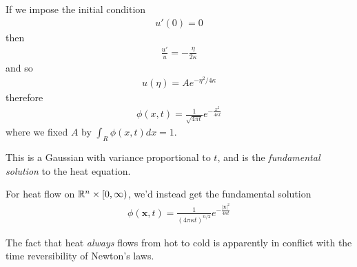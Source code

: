 \documentclass[a4paper]{article}
\begin{document}
If we impose the initial condition
\begin{equation*}
\begin{aligned}
u'\left(0\right) = 0
\end{aligned}
\end{equation*}
then
\begin{equation*}
\begin{aligned}
\frac{u'}{u} = -\frac{\eta}{2\kappa}
\end{aligned}
\end{equation*}
and so
\begin{equation*}
\begin{aligned}
u\left(\eta\right) = A e^{-\eta^2/4\kappa}
\end{aligned}
\end{equation*}
therefore
\begin{equation*}
\begin{aligned}
\phi\left(x,t\right) = \frac{1}{\sqrt{4\pi t}} e^{-\frac{x^2}{4\kappa t}}
\end{aligned}
\end{equation*}
where we fixed $A$ by $\int_R \phi\left(x,t\right) dx = 1$.

This is a Gaussian with variance proportional to $t$, and is the \emph{fundamental solution} to the heat equation.

For heat flow on $\mathbb{R}^n \times \left[0,\infty\right)$, we'd instead get the fundamental solution
\begin{equation*}
\begin{aligned}
\phi\left(\mathbf{x},t\right) = \frac{1}{\left(4\pi \kappa t\right)^{n/2}} e^{-\frac{|\mathbf{x}|^2}{4\kappa t}}
\end{aligned}
\end{equation*}


The fact that heat \emph{always} flows from hot to cold is apparently in conflict with the time reversibility of Newton's laws.
\end{document}

